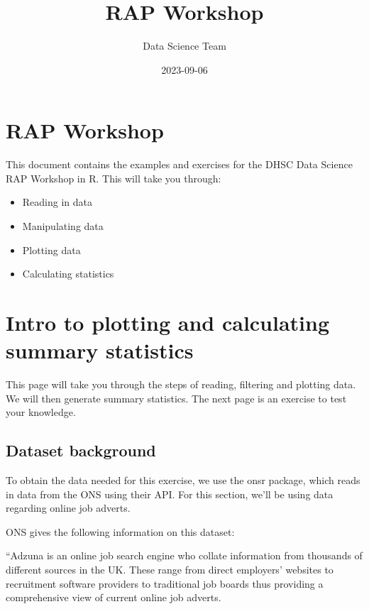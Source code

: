 \documentclass[
]{book}
\title{RAP Workshop}
\author{Data Science Team}
\date{2023-09-06}
\providecommand{\tightlist}{%
  \setlength{\itemsep}{0pt}\setlength{\parskip}{0pt}}
\begin{document}
\maketitle

{
\setcounter{tocdepth}{1}
\tableofcontents
}
\hypertarget{rap-workshop}{%
\chapter{RAP Workshop}\label{rap-workshop}}

This document contains the examples and exercises for the DHSC Data Science RAP Workshop in R. This will take you through:

\begin{itemize}
\tightlist
\item
  Reading in data
\item
  Manipulating data
\item
  Plotting data
\item
  Calculating statistics
\end{itemize}

\hypertarget{intro-to-plotting-and-calculating-summary-statistics}{%
\chapter{Intro to plotting and calculating summary statistics}\label{intro-to-plotting-and-calculating-summary-statistics}}

This page will take you through the steps of reading, filtering and plotting data. We will then generate summary statistics. The next page is an exercise to test your knowledge.

\hypertarget{dataset-background}{%
\section{Dataset background}\label{dataset-background}}

To obtain the data needed for this exercise, we use the onsr package, which reads in data from the ONS using their API. For this section, we'll be using data regarding online job adverts.

ONS gives the following information on this dataset:

``Adzuna is an online job search engine who collate information from thousands of different sources in the UK. These range from direct employers' websites to recruitment software providers to traditional job boards thus providing a comprehensive view of current online job adverts.
\end{document}
